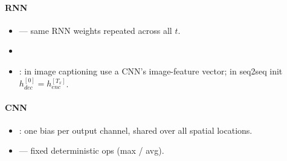 \paragraph{RNN}
\begin{itemize}
\item {} — same RNN weights repeated across all $t$.
\item {}
\item {}: in image captioning use a CNN's image-feature vector; in seq2seq init $h^{[0]}_{dec}{=}h^{[T_x]}_{enc}$.
\end{itemize}
\paragraph{CNN}
\begin{itemize}
\item {}: one bias per output channel, shared over all spatial locations.
\item {} — fixed deterministic ops (max / avg).
\end{itemize}
